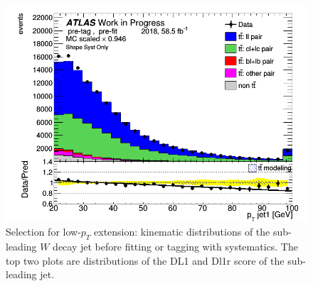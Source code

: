 \documentclass[letterpaper,12pt]{article}
\begin{document}
\begin{figure}[H]
\begin{minipage}[b]{.45\textwidth}
\end{minipage}\hfill
\begin{minipage}[b]{.45\textwidth}
\centering
\includegraphics[width=1\textwidth]{Distribution_March/DataMC_J1_pt.png}
\end{minipage}
\caption{Selection for low-$p_T$ extension: kinematic distributions of the sub-leading $W$ decay jet before fitting or tagging with systematics. The top two plots are distributions of the DL1 and Dl1r score of the sub-leading jet.} \label{fig:lowpT_selection}
\end{figure}
\end{document}
